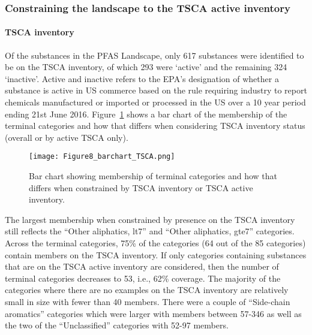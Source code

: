 \documentclass[
  super,
  preprint,
  3p]{elsarticle}
\let\oldparagraph\paragraph
\renewcommand{\paragraph}[1]{\oldparagraph{#1}\mbox{}}
\begin{document}
\hypertarget{constraining-the-landscape-to-the-tsca-active-inventory}{%
\subsubsection{Constraining the landscape to the TSCA active
inventory}\label{constraining-the-landscape-to-the-tsca-active-inventory}}

\hypertarget{tsca-inventory}{%
\paragraph{TSCA inventory}\label{tsca-inventory}}

Of the substances in the PFAS Landscape, only 617 substances were
identified to be on the TSCA inventory, of which 293 were `active' and
the remaining 324 `inactive'. Active and inactive refers to the EPA's
designation of whether a substance is active in US commerce based on the
rule requiring industry to report chemicals manufactured or imported or
processed in the US over a 10 year period ending 21st June 2016.
Figure~\ref{fig-barplot-tsca} shows a bar chart of the membership of the
terminal categories and how that differs when considering TSCA inventory
status (overall or by active TSCA only).

\begin{figure}

{\centering \texttt{[image: Figure8\_barchart\_TSCA.png]}

}

\caption{\label{fig-barplot-tsca}Bar chart showing membership of
terminal categories and how that differs when constrained by TSCA
inventory or TSCA active inventory.}

\end{figure}

The largest membership when constrained by presence on the TSCA
inventory still reflects the ``Other aliphatics, lt7'' and ``Other
aliphatics, gte7'' categories. Across the terminal categories, 75\% of
the categories (64 out of the 85 categories) contain members on the TSCA
inventory. If only categories containing substances that are on the TSCA
active inventory are considered, then the number of terminal categories
decreases to 53, i.e., 62\% coverage. The majority of the categories
where there are no examples on the TSCA inventory are relatively small
in size with fewer than 40 members. There were a couple of ``Side-chain
aromatics'' categories which were larger with members between 57-346 as
well as the two of the ``Unclassified'' categories with 52-97 members.
\end{document}
